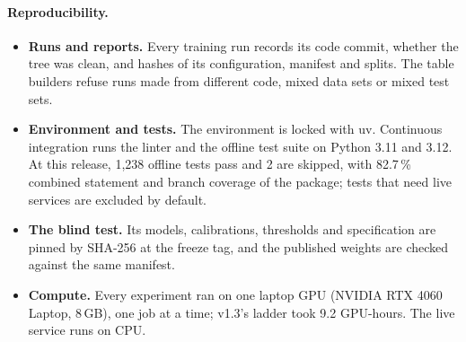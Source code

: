 \documentclass[10pt,twocolumn,a4paper]{article}
\newcommand{\pp}{\,\%}
\begin{document}
\paragraph{Reproducibility.}
\begin{itemize}
  \item \textbf{Runs and reports.} Every training run records its code commit, whether the tree was clean, and hashes
    of its configuration, manifest and splits. The table builders refuse runs made from different code, mixed data
    sets or mixed test sets.
  \item \textbf{Environment and tests.} The environment is locked with uv. Continuous integration runs the linter and
    the offline test suite on Python 3.11 and 3.12. At this release, 1,238 offline tests pass and 2 are skipped, with
    82.7\pp{} combined statement and branch coverage of the package; tests that need live services are excluded by
    default.
  \item \textbf{The blind test.} Its models, calibrations, thresholds and specification are pinned by SHA-256 at the
    freeze tag, and the published weights are checked against the same manifest.
  \item \textbf{Compute.} Every experiment ran on one laptop GPU (NVIDIA RTX 4060 Laptop, 8\,GB), one job at a time;
    v1.3's ladder took 9.2 GPU-hours. The live service runs on CPU.
\end{itemize}

\end{document}
